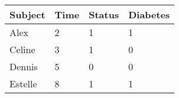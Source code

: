 ﻿\begin{table}[!ht]
    \centering
    \begin{tabular}{|l|l|l|l|}
    \hline
        Subject & Time & Status & Diabetes \\ \hline
        Alex & 2 & 1 & 1 \\ \hline
        Celine & 3 & 1 & 0 \\ \hline
        Dennis & 5 & 0 & 0 \\ \hline
        Estelle & 8 & 1 & 1 \\ \hline
    \end{tabular}
\end{table}